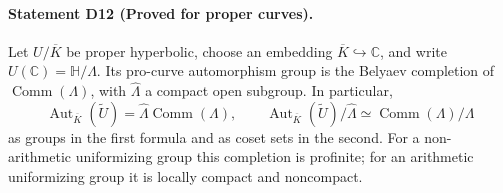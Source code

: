 \paragraph{Statement D12 (Proved for proper curves).}\label{res:D12}
Let $U/\overline K$ be proper hyperbolic, choose an embedding
$\overline K\hookrightarrow\mathbb C$, and write
$U(\mathbb C)=\mathbb H/\Lambda$.  Its pro-curve automorphism group is
the Belyaev completion of $\operatorname{Comm}(\Lambda)$, with
$\widehat\Lambda$ a compact open subgroup.  In particular,
\[
 \operatorname{Aut}_{\overline K}(\widetilde U)
       =\widehat\Lambda\operatorname{Comm}(\Lambda),\qquad
 \operatorname{Aut}_{\overline K}(\widetilde U)/\widehat\Lambda
       \simeq\operatorname{Comm}(\Lambda)/\Lambda
\]
as groups in the first formula and as coset sets in the second.
For a non-arithmetic uniformizing group this completion is profinite;
for an arithmetic uniformizing group it is locally compact and
noncompact.


